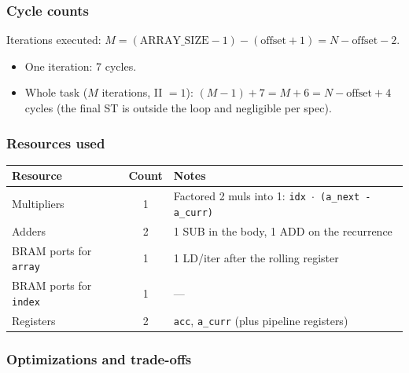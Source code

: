 \documentclass[11pt,a4paper]{article}
\begin{document}
\subsubsection*{Cycle counts}

Iterations executed: $M = (\text{ARRAY\_SIZE} - 1) - (\text{offset} + 1) = N - \text{offset} - 2$.

\begin{itemize}[noitemsep]
  \item One iteration: 7 cycles.
  \item Whole task ($M$ iterations, II $=1$): $(M-1) + 7 = M + 6 = N - \text{offset} + 4$ cycles (the final ST is outside the loop and negligible per spec).
\end{itemize}

\subsubsection*{Resources used}

\begin{center}
\begin{tabular}{lcl}
\toprule
Resource & Count & Notes \\
\midrule
Multipliers              & 1 & Factored 2 muls into 1: \texttt{idx $\cdot$ (a\_next - a\_curr)} \\
Adders                   & 2 & 1 SUB in the body, 1 ADD on the recurrence \\
BRAM ports for \texttt{array} & 1 & 1 LD/iter after the rolling register \\
BRAM ports for \texttt{index} & 1 & --- \\
Registers                & 2  & \texttt{acc}, \texttt{a\_curr} (plus pipeline registers) \\
\bottomrule
\end{tabular}
\end{center}

\subsubsection*{Optimizations and trade-offs}
\end{document}
